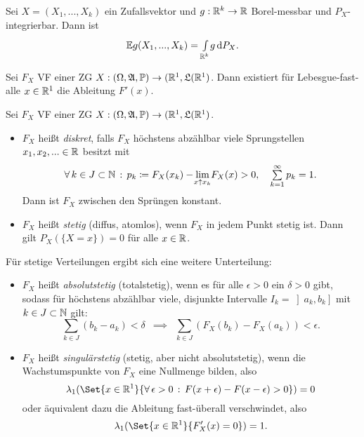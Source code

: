 \documentclass{cheat-sheet}
\newcommand{\Alg}{\mathfrak{A}} %
\newcommand{\LebAlg}{\mathfrak{L}} %
\renewcommand{\P}{\mathbb{P}} %
\newcommand{\E}{\mathbb{E}} %
\begin{document}
\begin{bem}
  Sei $X = (X_1, ..., X_k)$ ein Zufallsvektor und $g : \mathbb{R}^k \to \mathbb{R}$ Borel-messbar und $P_X$-integrierbar. Dann ist
  \[ \E g(X_1, ..., X_k) = \Int{\R^k}{}{g}{P_{X}}. \]
\end{bem}



\begin{satz}
  Sei $F_X$ VF einer ZG $X : (\Omega, \Alg, \P) \to (\R^1, \LebAlg(\R^1)$. Dann existiert für Lebesgue-fast-alle $x \in \mathbb{R}^1$ die Ableitung $F'(x)$.
\end{satz}

\begin{defn}
  Sei $F_X$ VF einer ZG $X : (\Omega, \Alg, \P) \to (\R^1, \LebAlg(\R^1)$.
  \begin{itemize}
    \item $F_X$ heißt \emph{diskret}, falls $F_X$ höchstens abzählbar viele Sprungstellen $x_1, x_2, ... \in \mathbb{R}$ besitzt mit
      \[ \fa{k \in J \subset \N} p_k \coloneqq F_X(x_k) - \lim_{\mathclap{x \uparrow x_k}} F_X(x) > 0, \quad \sum_{k=1}^\infty p_k = 1. \]
    Dann ist $F_X$ zwischen den Sprüngen konstant.
    \item $F_X$ heißt \emph{stetig} (diffus, atomlos), wenn $F_X$ in jedem Punkt stetig ist. Dann gilt $P_X(\{ X = x \}) = 0$ für alle $x \in \mathbb{R}$.
  \end{itemize}
  Für stetige Verteilungen ergibt sich eine weitere Unterteilung:
  \begin{itemize}
    \item $F_X$ heißt \emph{absolutstetig} (totalstetig), wenn es für alle $\epsilon > 0$ ein $\delta > 0$ gibt, sodass für höchstens abzählbar viele, disjunkte Intervalle $I_k = \left]a_k, b_k\right]$ mit $k \in J \subset \mathbb{N}$ gilt:
    \[ \sum_{k \in J} (b_k - a_k) < \delta \enspace \implies \enspace \sum_{k \in J} (F_X(b_k) - F_X(a_k)) < \epsilon. \]
    \item $F_X$ heißt \emph{singulärstetig} (stetig, aber nicht absolutstetig), wenn die Wachstumspunkte von $F_X$ eine Nullmenge bilden, also
    \[ \lambda_1(\Set{ x \in \R^1 }{ \fa{\epsilon > 0} F(x+\epsilon)- F(x-\epsilon) > 0 }) = 0 \]
    oder äquivalent dazu die Ableitung fast-überall verschwindet, also
    \[ \lambda_1(\Set{ x \in \R^1 }{ F_X'(x) = 0 }) = 1. \]
  \end{itemize}
\end{defn}
\end{document}
